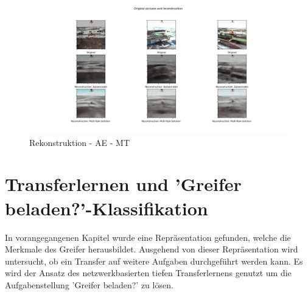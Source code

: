 	\begin{figure}[h]
		\centering
		\includegraphics[width=1\textwidth, center]{bilder/Hauptteil/MT_Grapple/OriginalPicturesandReconstruction.png}
		\caption{Rekonstruktion - AE - MT}
		\label{img:RekonstruktionMTAE}
	\end{figure}  
	
	
	
	
	\section{Transferlernen und 'Greifer beladen?'-Klassifikation}
	\label{sec:TransferLearningGrappleLoaded}
	In vorangegangenen Kapitel wurde eine Repräsentation gefunden, welche die Merkmale des Greifer herausbildet. Ausgehend von dieser Repräsentation wird untersucht, ob ein Transfer auf weitere Aufgaben durchgeführt werden kann. Es wird der Ansatz des netzwerkbasierten tiefen Transferlernens genutzt um die Aufgabenstellung 'Greifer beladen?' zu lösen.
